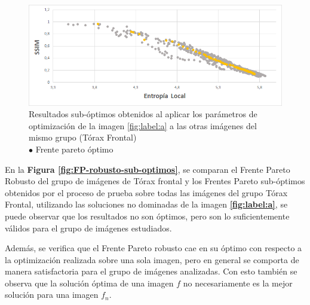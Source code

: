\begin{figure}[H]
  \begin{center}
    \leavevmode
    \includegraphics[width=14cm]{Chapter6/Chapter6Figs/FP-torax_frontal/img1-FP-variado-optimo.png}
    \caption {Resultados sub-óptimos obtenidos al aplicar los parámetros de optimización de la imagen \ref{fig:label:a} a las otras imágenes del mismo grupo (Tórax Frontal) \\
    {{\color{yellow} {$\bullet$}} Frente pareto óptimo}}
    \label{fp-original-resultante-tf}
  \end{center}
\end{figure}

En la \textbf{Figura \ref{fig:FP-robusto-sub-optimos}}, se comparan el Frente Pareto Robusto del grupo de imágenes de Tórax frontal y los Frentes Pareto sub-óptimos obtenidos por el proceso de prueba sobre todas las imágenes del grupo Tórax Frontal, utilizando las soluciones no dominadas de la imagen \textbf{\ref{fig:label:a}}, se puede observar que los resultados no son óptimos, pero son lo suficientemente válidos para el grupo de imágenes estudiados.


Además, se verifica que el Frente Pareto robusto cae en su óptimo con respecto a la optimización realizada sobre una sola imagen, pero en general se comporta de manera satisfactoria para el grupo de imágenes analizadas. Con esto también se observa que la solución óptima de una imagen $f$ no necesariamente es la mejor solución para una imagen $f_n$.

